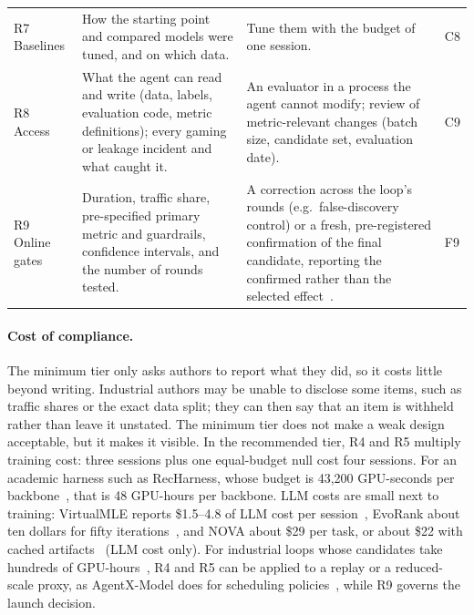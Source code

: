 \documentclass[sigconf,nonacm]{acmart}
\begin{document}
\begin{table}[t]
\begin{tabularx}{\textwidth}{@{}l>{\hsize=0.95\hsize}X>{\hsize=1.05\hsize}Xl@{}}
R7 Baselines & How the starting point and compared models were tuned, and on which data. & Tune them with the
budget of one session. & C8 \\
R8 Access & What the agent can read and write (data, labels, evaluation code, metric definitions); every gaming or
leakage incident and what caught it. & An evaluator in a process the agent cannot modify; review of metric-relevant
changes (batch size, candidate set, evaluation date). & C9 \\
R9 Online gates & Duration, traffic share, pre-specified primary metric and guardrails, confidence intervals, and the
number of rounds tested. & A correction across the loop's rounds (e.g.\ false-discovery control) or a fresh, pre-registered confirmation of the final candidate,
reporting the confirmed rather than the selected effect~\cite{kohavi2020trustworthy}. & F9 \\
\bottomrule
\end{tabularx}
\end{table}



\paragraph{Cost of compliance.} The minimum tier only asks authors to report what they did, so it costs little beyond
writing. Industrial authors may be unable to disclose some items, such as traffic shares or the exact data
split; they can then say that an item is withheld rather than leave it unstated. The minimum tier does not make a weak design acceptable, but it makes it visible. In the recommended tier, R4 and R5
multiply training cost: three sessions plus one equal-budget null cost four sessions. For an academic harness such
as RecHarness, whose budget is 43{,}200 GPU-seconds per backbone~\cite{ling2026recharness}, that is 48 GPU-hours per
backbone. LLM costs are small next to training: VirtualMLE reports \$1.5--4.8 of LLM cost per
session~\cite{cao2026virtualmle}, EvoRank about ten dollars for fifty iterations~\cite{patel2026evorank}, and NOVA
about \$29 per task, or about \$22 with cached artifacts~\cite{liu2026nova} (LLM cost only). For industrial loops whose candidates take hundreds of
GPU-hours~\cite{li2026autorecsys}, R4 and R5 can be applied to a replay or a reduced-scale proxy, as AgentX-Model
does for scheduling policies~\cite{yang2026agentxmodel}, while R9 governs the launch decision.
\end{document}
